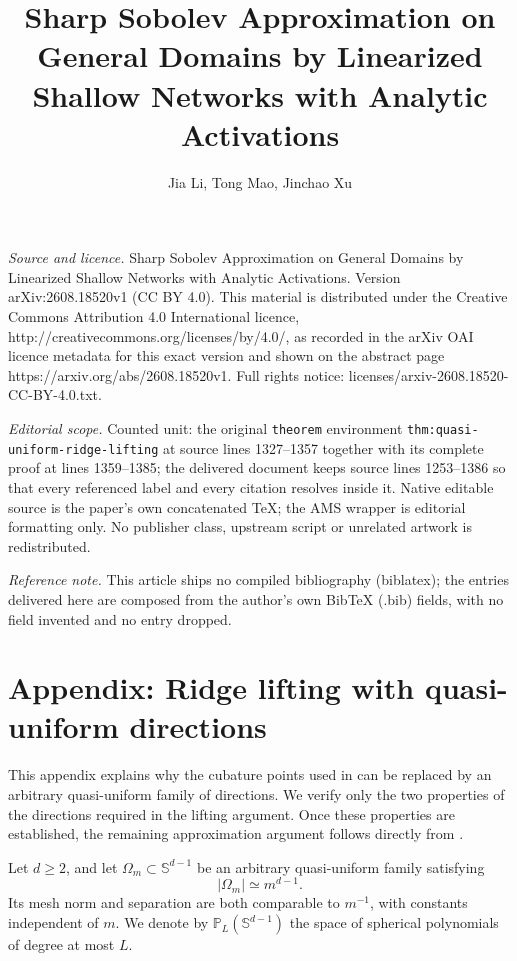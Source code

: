 \documentclass[10pt,a4paper]{amsart}
\numberwithin{equation}{section}
\def\SS{\mathbb{S}}
\begin{document}
\title[Sharp Sobolev Approximation on General Domains by Linearized]{Sharp Sobolev Approximation on General Domains by Linearized Shallow Networks with Analytic Activations}
\author{Jia Li, Tong Mao, Jinchao Xu}
\date{}
\maketitle
\noindent\emph{Source and licence.} Sharp Sobolev Approximation on General Domains by Linearized Shallow Networks with Analytic Activations. Version arXiv:2608.18520v1 (CC BY 4.0). This material is distributed under the Creative Commons Attribution 4.0 International licence, http://creativecommons.org/licenses/by/4.0/, as recorded in the arXiv OAI licence metadata for this exact version and shown on the abstract page https://arxiv.org/abs/2608.18520v1. Full rights notice: licenses/arxiv-2608.18520-CC-BY-4.0.txt.\par\smallskip
\noindent\textit{Editorial scope.} Counted unit: the original \texttt{theorem} environment \texttt{thm:quasi-uniform-ridge-lifting} at source lines 1327--1357 together with its complete proof at lines 1359--1385; the delivered document keeps source lines 1253--1386 so that every referenced label and every citation resolves inside it. Native editable source is the paper's own concatenated TeX; the AMS wrapper is editorial formatting only. No publisher class, upstream script or unrelated artwork is redistributed.
\par\smallskip\noindent\textit{Reference note.} This article ships no compiled bibliography (biblatex); the entries delivered here are composed from the author's own BibTeX (.bib) fields, with no field invented and no entry dropped.
\section{Appendix: Ridge lifting with quasi-uniform directions}\label{app:quasiuniform-lifting}

This appendix explains why the cubature points used in \cite{petrushev1998approximation} can be replaced by an arbitrary quasi-uniform family of directions. We verify only the two properties of the directions required in the lifting argument. Once these properties are established, the remaining approximation argument follows directly from \cite[Sections~3, 7, and~8]{petrushev1998approximation}.

Let $d\geq2$, and let $\Omega_m\subset\SS^{d-1}$ be an arbitrary quasi-uniform family satisfying
$$
|\Omega_m|\simeq m^{d-1}.
$$
Its mesh norm and separation are both comparable to $m^{-1}$, with constants independent of $m$. We denote by $\mathbb P_L(\SS^{d-1})$ the space of spherical polynomials of degree at most $L$.
\end{document}
